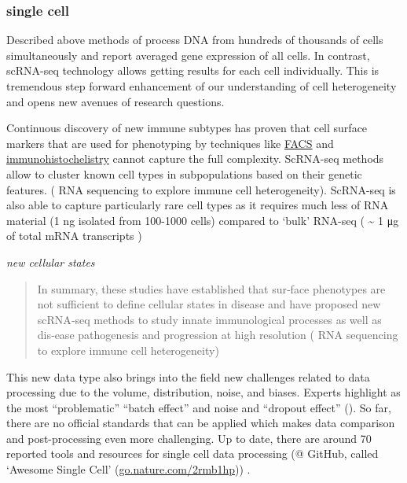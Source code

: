 \documentclass[12pt,]{book}
\theoremstyle{definition}
\theoremstyle{definition}
\theoremstyle{definition}
\theoremstyle{remark}
\begin{document}
\hypertarget{single-cell}{%
\subsubsection{single cell}\label{single-cell}}

Described above methods of process DNA from hundreds of thousands of
cells simultaneously and report averaged gene expression of all cells.
In contrast, scRNA-seq technology allows getting results for each cell
individually. This is tremendous step forward enhancement of our
understanding of cell heterogeneity and opens new avenues of research
questions.

Continuous discovery of new immune subtypes has proven that cell surface
markers that are used for phenotyping by techniques like
\protect\hyperlink{facs}{FACS} and
\protect\hyperlink{staining}{immunohistochelistry} cannot capture the
full complexity. ScRNA-seq methods allow to cluster known cell types in
subpopulations based on their genetic features. (\citet{Single-cell} RNA
sequencing to explore immune cell heterogeneity). ScRNA-seq is also able
to capture particularly rare cell types as it requires much less of RNA
material (1 ng isolated from 100-1000 cells) compared to `bulk' RNA-seq
( \textasciitilde{} 1 μg of total mRNA transcripts )

\emph{new cellular states}

\begin{quote}
In summary, these studies have established that sur‑face phenotypes are
not sufficient to define cellular states in disease and have proposed
new scRNA‑seq methods to study innate immunological processes as well as
dis‑ease pathogenesis and progression at high resolution
(\citet{Single-cell} RNA sequencing to explore immune cell
heterogeneity)
\end{quote}

This new data type also brings into the field new challenges related to
data processing due to the volume, distribution, noise, and biases.
Experts highlight as the most ``problematic'' ``batch effect'' and noise
and ``dropout effect''
(\citet{https://www.nature.com/news/single-cell-sequencing-made-simple-1.22233}).
So far, there are no official standards that can be applied which makes
data comparison and post-processing even more challenging. Up to date,
there are around 70 reported tools and resources for single cell data
processing (@ GitHub, called `Awesome Single Cell'
(\href{http://go.nature.com/2rmb1hp}{go.nature.com/2rmb1hp})) .
\end{document}
